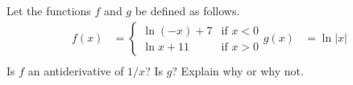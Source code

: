 Let the functions $f$ and $g$ be defined as follows.
\begin{align*}
  f(x) &=  \begin{cases}
   \ln(-x)+7 & \text{if } x < 0 \\
   \ln x+11  & \text{if } x > 0
  \end{cases}
  g(x) &= \ln|x| \\
\end{align*}
Is $f$ an antiderivative of $1/x$? Is $g$? Explain
why or why not.
